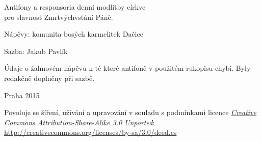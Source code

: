 \documentclass[a5paper, twoside, 12pt]{article}
\begin{document}

\pagebreak
{}




\vspace{6mm}


\clearpage

\mbox{}
\vfill

\pagestyle{empty}

\setlength{\parindent}{0pt}

Antifony a responsoria denní modlitby církve\\
pro slavnost Zmrtvýchvstání Páně.

Nápěvy: komunita bosých karmelitek Dačice

Sazba: Jakub Pavlík

Údaje o žalmovém nápěvu k té které antifoně v použitém rukopisu chybí.
Byly redakčně doplněny při sazbě.

Praha 2015

\vspace{5mm}

Povoluje se šíření, užívání a upravování v souladu s podmínkami
licence \href{http://creativecommons.org/licenses/by-sa/3.0/deed.cs}{\emph{Creative Commons At\-tri\-bu\-tion-\-Sha\-re-A\-li\-ke 3.0 Unported}}:
\href{http://creativecommons.org/licenses/by-sa/3.0/deed.cs}{http://creativecommons.org/licenses/by-sa/3.0/deed.cs}
\end{document}
